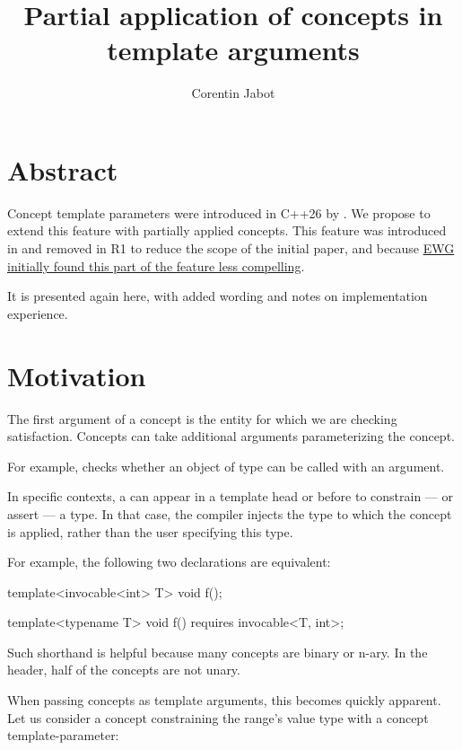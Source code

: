 \documentclass{wg21}
\title{Partial application of concepts in template arguments}
\author{Corentin Jabot}{corentin.jabot@gmail.com}
\begin{document}
\maketitle

\section{Abstract}

Concept template parameters were introduced in C++26 by . We propose to extend this feature with partially applied concepts.
This feature was introduced in  and removed in R1 to reduce the scope of the initial paper,
and because \href{https://github.com/cplusplus/papers/issues/1546#issuecomment-1587401642}{EWG initially found this part of the feature less compelling}.

It is presented again here, with added wording and notes on implementation experience.

\section{Motivation}


The first argument of a concept is the entity for which we are checking satisfaction.
Concepts can take additional arguments parameterizing the concept.

For example,  checks whether an object of type  can be called
with an  argument.

In specific contexts, a  can appear in a template head or before  to constrain --- or assert ---
a type. In that case, the compiler injects the type to which the concept is applied, rather than the user specifying this type.

For example, the following two declarations are equivalent:

\begin{colorblock}
template<invocable<int> T>
void f();

template<typename T>
void f() requires invocable<T, int>;
\end{colorblock}

Such shorthand is helpful because many concepts are binary or n-ary. In the  header, half of the concepts are not unary.


When passing concepts as template arguments, this becomes quickly apparent.
Let us consider a  concept constraining the range's value type with a concept template-parameter:
\end{document}
